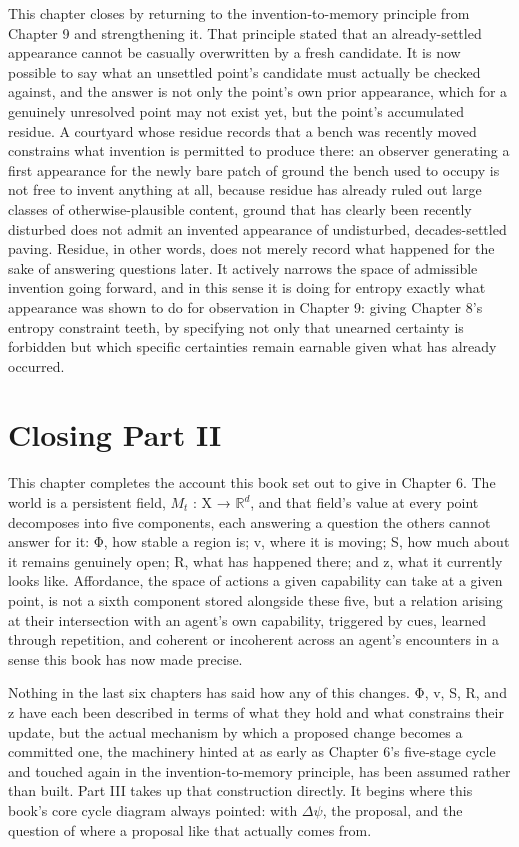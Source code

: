This chapter closes by returning to the invention-to-memory principle from Chapter 9 and strengthening it. That principle stated that an already-settled appearance cannot be casually overwritten by a fresh candidate. It is now possible to say what an unsettled point's candidate must actually be checked against, and the answer is not only the point's own prior appearance, which for a genuinely unresolved point may not exist yet, but the point's accumulated residue. A courtyard whose residue records that a bench was recently moved constrains what invention is permitted to produce there: an observer generating a first appearance for the newly bare patch of ground the bench used to occupy is not free to invent anything at all, because residue has already ruled out large classes of otherwise-plausible content, ground that has clearly been recently disturbed does not admit an invented appearance of undisturbed, decades-settled paving. Residue, in other words, does not merely record what happened for the sake of answering questions later. It actively narrows the space of admissible invention going forward, and in this sense it is doing for entropy exactly what appearance was shown to do for observation in Chapter 9: giving Chapter 8's entropy constraint teeth, by specifying not only that unearned certainty is forbidden but which specific certainties remain earnable given what has already occurred.

\section{Closing Part II}

This chapter completes the account this book set out to give in Chapter 6. The world is a persistent field, \(M_t\) : X → \(\mathbb{R}^d\), and that field's value at every point decomposes into five components, each answering a question the others cannot answer for it: Φ, how stable a region is; v, where it is moving; S, how much about it remains genuinely open; R, what has happened there; and z, what it currently looks like. Affordance, the space of actions a given capability can take at a given point, is not a sixth component stored alongside these five, but a relation arising at their intersection with an agent's own capability, triggered by cues, learned through repetition, and coherent or incoherent across an agent's encounters in a sense this book has now made precise.

Nothing in the last six chapters has said how any of this changes. Φ, v, S, R, and z have each been described in terms of what they hold and what constrains their update, but the actual mechanism by which a proposed change becomes a committed one, the machinery hinted at as early as Chapter 6's five-stage cycle and touched again in the invention-to-memory principle, has been assumed rather than built. Part III takes up that construction directly. It begins where this book's core cycle diagram always pointed: with \(\Delta\psi\), the proposal, and the question of where a proposal like that actually comes from.
